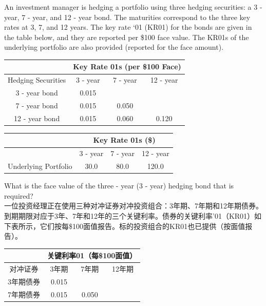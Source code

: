 \documentclass{article}
\newcounter{question} %
\begin{document}
\begin{question}
    An investment manager is hedging a portfolio using three hedging securities: a 3 - year, 7 - year, and 12 - year bond. The maturities correspond to the three key rates at 3, 7, and 12 years. The key rate ‘01 (KR01) for the bonds are given in the table below, and they are reported per \$100 face value. The KR01s of the underlying portfolio are also provided (reported for the face amount).
    \begin{center}
    \begin{tabular}{|c|c|c|c|}
    \hline
    & \multicolumn{3}{c|}{Key Rate 01s (per \$100 Face)} \\
    \hline
    Hedging Securities & 3 - year & 7 - year & 12 - year \\
    \hline
    3 - year bond & 0.015 & & \\
    \hline
    7 - year bond & 0.015 & 0.050 & \\
    \hline
    12 - year bond & 0.015 & 0.060 & 0.120 \\
    \hline
    \end{tabular}
    \end{center}
    \begin{center}
    \begin{tabular}{|c|c|c|c|}
    \hline
    & \multicolumn{3}{c|}{Key Rate 01s (\$)} \\
    \hline
    & 3 - year & 7 - year & 12 - year \\
    \hline
    Underlying Portfolio & 30.0 & 80.0 & 120.0 \\
    \hline
    \end{tabular}
    \end{center}
    What is the face value of the three - year (3 - year) hedging bond that is required?
    \\一位投资经理正在使用三种对冲证券对冲投资组合：3年期、7年期和12年期债券。到期期限对应于3年、7年和12年的三个关键利率。债券的关键利率'01（KR01）如下表所示，它们按每\$100面值报告。标的投资组合的KR01也已提供（按面值报告）。
    \begin{center}
    \begin{tabular}{|c|c|c|c|}
    \hline
    & \multicolumn{3}{c|}{关键利率01（每\$100面值）} \\
    \hline
    对冲证券 & 3年期 & 7年期 & 12年期 \\
    \hline
    3年期债券 & 0.015 & & \\
    \hline
    7年期债券 & 0.015 & 0.050 & \\
    \hline

\end{tabular}
\end{center}
\end{question}
\end{document}
